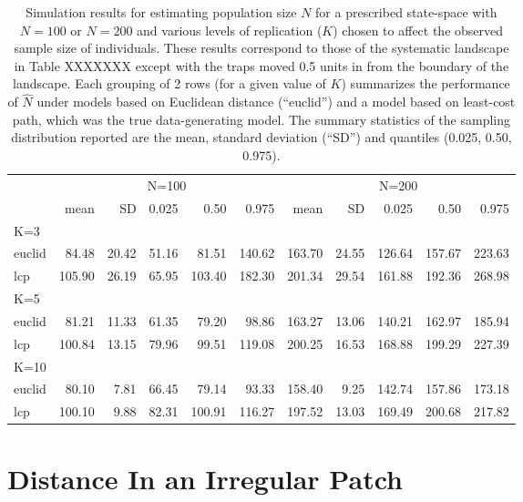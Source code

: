 \begin{table}[htp]
{\tiny
\caption{Simulation results for estimating population size $N$ for a prescribed state-space with
$N=100$ or $N=200$ and various levels of replication ($K$) chosen to affect the observed sample
size of individuals. These results correspond to those of the
systematic landscape in Table XXXXXXX  except with the traps
moved 0.5 units in from the boundary of the landscape.
Each grouping of 2 rows (for a given value of $K$) summarizes the
performance of $\hat{N}$ under models based on 
Euclidean distance  (``euclid'') and 
a model based on least-cost path, which was the true data-generating model.
The summary statistics of the
sampling distribution reported are the mean, standard deviation
(``SD'') and quantiles (0.025, 0.50, 0.975).
}
\begin{tabular}{l|rrrrr|rrrrr}
         & \multicolumn{5}{c}{N=100   } & \multicolumn{5}{c}{N=200  }  \\
         &   mean &  SD  & 0.025 & 0.50 & 0.975  & mean  & SD   & 0.025 & 0.50  & 0.975 \\ \hline
K=3      &        &      &       &      &        &       &      &       &       &       \\
euclid   &   84.48& 20.42& 51.16 & 81.51& 140.62 &163.70 &24.55 &126.64 &157.67 &223.63 \\
lcp      &  105.90& 26.19& 65.95 &103.40& 182.30 &201.34 &29.54 &161.88 &192.36 &268.98\\
K=5      &        &      &       &      &        &       &      &       &       &       \\
euclid   & 81.21  &11.33 &61.35  &79.20 & 98.86  &163.27 &13.06 &140.21 &162.97 &185.94\\
lcp      & 100.84 &13.15 &79.96  &99.51 &119.08  &200.25 &16.53 &168.88 &199.29 &227.39\\
K=10     &        &      &       &      &        &       &      &       &       &       \\
euclid   &  80.10 & 7.81 &66.45  &79.14 &93.33   &158.40 & 9.25 &142.74 &157.86 &173.18\\
lcp      & 100.10 & 9.88 &82.31  &100.91&116.27  &197.52 &13.03 &169.49 &200.68 &217.82\\ \hline
\end{tabular}
}
\label{tab.results3}
\end{table}





\section{Distance In an Irregular Patch}
\label{ecoldist.sec.buffer}

